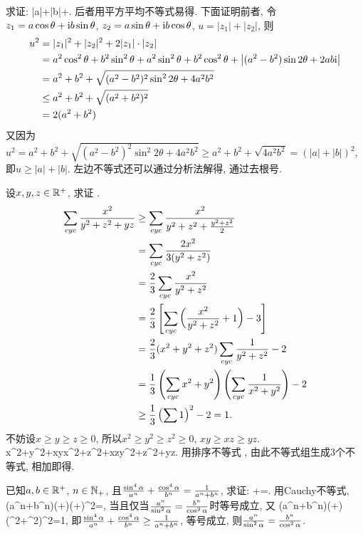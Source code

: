 \bq{}{}
求证: 
\bee
|a|+|b|\le{}+\le{}.
\eee
\eq
\ba
后者用平方平均不等式易得. 下面证明前者, 令$z_{1}=a\cos\theta+\mathrm{i} b\sin\theta$, $z_{2}=a\sin\theta+\mathrm{i} b\cos\theta$,
$u=|z_{1}|+|z_{2}|$, 则
\begin{align*}
u^{2} & =|z_{1}|^{2}+|z_{2}|^{2}+2|z_{1}|\cdot|z_{2}|\\
 & =a^{2}\cos^{2}\theta+b^{2}\sin^{2}\theta+a^{2}\sin^{2}\theta+b^{2}\cos^{2}\theta+\left|(a^{2}-b^{2})\sin2\theta+2ab\mathrm{i}\right|\\
 & =a^{2}+b^{2}+\sqrt{(a^{2}-b^{2})^{2}\sin^{2}2\theta+4a^{2}b^{2}}\\
 & \le a^{2}+b^{2}+\sqrt{(a^{2}+b^{2})^{2}}\\
 & =2(a^{2}+b^{2})
\end{align*}
又因为$u^{2}=a^{2}+b^{2}+\sqrt{(a^{2}-b^{2})^{2}\sin^{2}2\theta+4a^{2}b^{2}}\ge a^{2}+b^{2}+\sqrt{4a^{2}b^{2}}=(|a|+|b|)^{2}$,
即$u\ge|a|+|b|$. 左边不等式还可以通过分析法解得, 通过去根号.
\ea

\bq{}{}
设$x,y,z\in\mathbb{R}^{+}$, 求证
\bee
\sumcyc{}.
\eee
\eq
\ba
\begin{align*}
\sum\limits_{cyc}\frac{x^{2}}{y^{2}+z^{2}+yz} & \ge\sum\limits_{cyc}\frac{x^{2}}{y^{2}+z^{2}+\frac{y^{2}+z^{2}}{2}}\\
 & =\sum\limits_{cyc}\frac{2x^{2}}{3(y^{2}+z^{2})}\\
 & =\frac{2}{3}\sum\limits_{cyc}\frac{x^{2}}{y^{2}+z^{2}}\\
 & =\frac{2}{3}\left[\sum\limits_{cyc}\left(\frac{x^{2}}{y^{2}+z^{2}}+1\right)-3\right]\\
 & =\frac{2}{3}(x^{2}+y^{2}+z^{2})\sum\limits_{cyc}\frac{1}{y^{2}+z^{2}}-2\\
 & =\frac{1}{3}\left(\sum\limits_{cyc} x^{2}+y^{2}\right)\left(\sum\limits_{cyc}\frac{1}{x^{2}+y^{2}}\right)-2\\
 & \ge\frac{1}{3}\left(\sum1\right)^{2}-2=1.
\end{align*}
\ea
\ba
不妨设$x\ge y\ge z\ge0$, 所以$x^{2}\ge y^{2}\ge z^{2}\ge0$, $xy\ge xz\ge yz$.
\bee
x^{2}+y^{2}+xy\ge x^{2}+z^{2}+xz\ge y^{2}+z^{2}+yz.
\eee
用排序不等式
\bee
\sumcyc{}\ge\sumcyc{}\ge\sumcyc{}\ge\sumcyc{},
\eee
由此不等式组生成$3$个不等式, 相加即得.
\ea

\bq{}{}
已知$a,b\in\mathbb{R}^{+}$, $n\in\mathbb{N}_{+}$, 且$\frac{\sin^{4}\alpha}{a^{n}}+\frac{\cos^{4}\alpha}{b^{n}}=\frac{1}{a^{n}+b^{n}}$,
求证:
\bee
{}+=.
\eee
\eq
\ba
用Cauchy不等式, 
\bee
(a^{n}+b^{n})\left(+\right)\ge\left(+\right)^{2}=,
\eee
当且仅当$\frac{a^{n}}{\sin^{2}\alpha}=\frac{b^{n}}{\cos^{2}\alpha}$时等号成立, 又
\bee
(a^{n}+b^{n})\left(+\right)\ge(\sin^{2}\a+\cos^{2}\a)^{2}=1,
\eee
即$\frac{\sin^{4}\alpha}{a^{n}}+\frac{\cos^{4}\alpha}{b^{n}}\ge\frac{1}{a^{n}+b^{n}}$,
等号成立, 则$\frac{a^{n}}{\sin^{2}\alpha}=\frac{b^{n}}{\cos^{2}\alpha}$.
\ea

